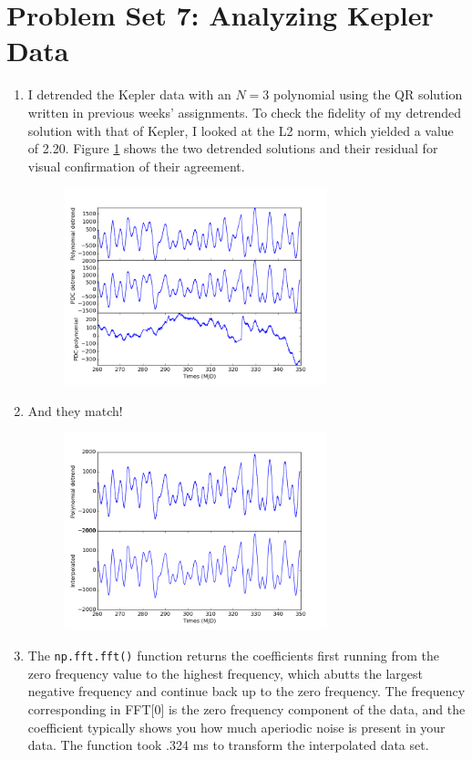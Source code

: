\documentclass[10pt, preprint]{aastex}
\begin{document}
\section*{Problem Set 7: Analyzing Kepler Data}
\begin{enumerate}
\item I detrended the Kepler data with an $N=3$ polynomial using the QR solution written in previous weeks' assignments. To check the fidelity of my detrended solution with that of Kepler, I looked at the L2 norm, which yielded a value of 2.20. Figure \ref{fig1} shows the two detrended solutions and their residual for visual confirmation of their agreement.
\begin{figure}[!ht]
\centering
\includegraphics[width=3in]{hw7_fig1.png}
\caption{\centering \label{fig1}}
\end{figure}


\item And they match!
\begin{figure}[!ht]
\centering
\includegraphics[width=3in]{hw7_fig2.png}
\caption{\centering \label{fig2}}
\end{figure}

\item The \verb|np.fft.fft()| function returns the coefficients first running from the zero frequency value to the highest frequency, which abutts the largest negative frequency and continue back up to the zero frequency. The frequency corresponding in FFT[0] is the zero frequency component of the data, and the coefficient typically shows you how much aperiodic noise is present in your data. The function took .324 ms to transform the interpolated data set.


\end{enumerate}
\end{document}
